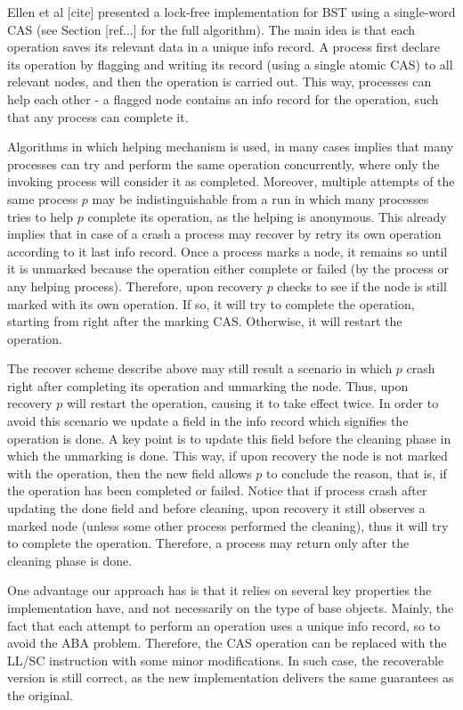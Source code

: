 Ellen et al [cite] presented a lock-free implementation for BST using a single-word CAS (see Section [ref...] for the full algorithm). The main idea is that each operation saves its relevant data in a unique info record. A process first declare its operation by flagging and writing its record (using a single atomic CAS) to all relevant nodes, and then the operation is carried out. This way, processes can help each other - a flagged node contains an info record for the operation, such that any process can complete it.

Algorithms in which helping mechanism is used, in many cases implies that many processes can try and perform the same operation concurrently, where only the invoking process will consider it as completed. Moreover, multiple attempts of the same process $p$ may be indistinguishable from a run in which many processes tries to help $p$ complete its operation, as the helping is anonymous. This already implies that in case of a crash a process may recover by retry its own operation according to it last info record. Once a process marks a node, it remains so until it is unmarked because the operation either complete or failed (by the process or any helping process). Therefore, upon recovery $p$ checks to see if the node is still marked with its own operation. If so, it will try to complete the operation, starting from right after the marking CAS. Otherwise, it will restart the operation.

The recover scheme describe above may still result a scenario in which $p$ crash right after completing its operation and unmarking the node. Thus, upon recovery $p$ will restart the operation, causing it to take effect twice. In order to avoid this scenario we update a field in the info record which signifies the operation is done. A key point is to update this field before the cleaning phase in which the unmarking is done. This way, if upon recovery the node is not marked with the operation, then the new field allows $p$ to conclude the reason, that is, if the operation has been completed or failed. Notice that if process crash after updating the done field and before cleaning, upon recovery it still observes a marked node (unless some other process performed the cleaning), thus it will try to complete the operation. Therefore, a process may return only after the cleaning phase is done.

One advantage our approach has is that it relies on several key properties the implementation have, and not necessarily on the type of base objects. Mainly, the fact that each attempt to perform an operation uses a unique info record, so to avoid the ABA problem. Therefore, the CAS operation can be replaced with the LL/SC instruction with some minor modifications. In such case, the recoverable version is still correct, as the new implementation delivers the same guarantees as the original.


